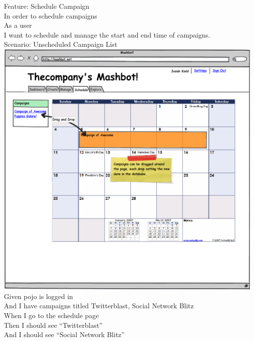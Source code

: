 \documentclass[12pt]{article}
\begin{document}
\begin{hangparas}{0.25in}{1}
Feature: Schedule Campaign \\
In order to schedule campaigns \\
As a user \\
I want to schedule and manage the start and end time of campaigns. \\

Scenario: Unscheduled Campaign List \\
\includegraphics[width=\textwidth]{../mockups/schedule.png}
  Given pojo is logged in \\
  And I have campaigns titled Twitterblast, Social Network Blitz \\
  When I go to the schedule page \\
  Then I should see ``Twitterblast'' \\
  And I should see ``Social Network Blitz'' \\
  

\end{hangparas}
\end{document}
